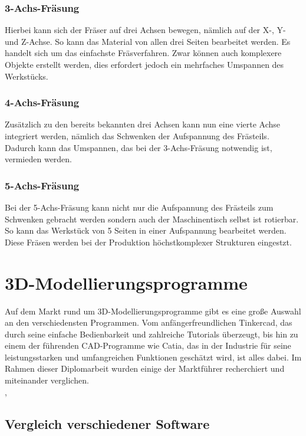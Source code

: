 \subsubsection{3-Achs-Fräsung}
Hierbei kann sich der Fräser auf drei Achsen bewegen, nämlich auf der X-, Y- und Z-Achse. So kann das Material von allen drei Seiten bearbeitet werden. Es handelt sich um das einfachste Fräsverfahren. Zwar können auch komplexere Objekte erstellt werden, dies erfordert jedoch ein mehrfaches Umspannen des Werkstücks.

\subsubsection{4-Achs-Fräsung}
Zusätzlich zu den bereits bekannten drei Achsen kann nun eine vierte Achse integriert werden, nämlich das Schwenken der Aufspannung des Frästeils. Dadurch kann das Umspannen, das bei der 3-Achs-Fräsung notwendig ist, vermieden werden.

\subsubsection{5-Achs-Fräsung}
Bei der 5-Achs-Fräsung kann nicht nur die Aufspannung des Frästeils zum Schwenken gebracht werden sondern auch der Maschinentisch selbst ist rotierbar. So kann das Werkstück von 5 Seiten in einer Aufspannung bearbeitet werden. Diese Fräsen werden bei der Produktion höchstkomplexer Strukturen eingestzt.\\
\cite{Fraesen-3/4/5-Achs}


\section{3D-Modellierungsprogramme}
Auf dem Markt rund um 3D-Modellierungsprogramme gibt es eine große Auswahl an den verschiedensten Programmen. Vom anfängerfreundlichen Tinkercad, das durch seine einfache Bedienbarkeit und zahlreiche Tutorials überzeugt, bis hin zu einem der führenden CAD-Programme wie Catia, das in der Industrie für seine leistungsstarken und umfangreichen Funktionen geschätzt wird, ist alles dabei. Im Rahmen dieser Diplomarbeit wurden einige der Marktführer recherchiert und miteinander verglichen. \\
\cite{CAD-Programme}, \cite{3D-Printing-Software}

\subsection{Vergleich verschiedener Software}

